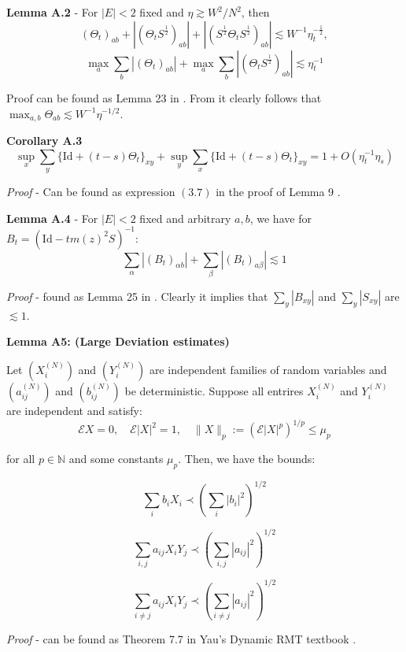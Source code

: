 \documentclass[11pt]{article}
\newenvironment{boxtheorem}[1]
  {\begin{mdframed}\noindent\textbf{#1}\itshape\space}
  {\end{mdframed}}
\newenvironment{boxt}[1]
  {\begin{mdframed}\noindent\textbf{#1}\normalfont\space}
  {\end{mdframed}}
\newcommand{\E}{\mathcal{E}}
\newcommand{\N}{\mathbb{N}}
\begin{document}
\begin{boxt}{Lemma A.2} \label{lemma-a2} -
 For $|E|<2$ fixed and $\eta\gtrsim W^2/N^2$, then $$(\Theta_t)_{ab} + |(\Theta_tS^{\frac{1}{2}})_{ab}| + |\left(S^{\frac{1}{2}}\Theta_t S^{\frac{1}{2}}\right)_{ab}|\lesssim W^{-1}\eta_t^{-\frac{1}{2}}, $$
 $$\max_a \sum_b |(\Theta_t)_{ab}|+\max_a \sum_b |(\Theta_tS^{\frac{1}{2}})_{ab}|\lesssim \eta_t^{-1}$$
\end{boxt}
Proof can be found as Lemma 23 in \cite{bandSDE}. From it clearly follows that $\max_{a,b}\Theta_{ab} \lesssim W^{-1}\eta^{-1/2}$. 

\begin{boxt}{Corollary A.3} \label{cor-a3} 
$$\sup_x \sum_y \{\text{Id}+(t-s)\Theta_t\}_{xy} + \sup_y \sum_x \{\text{Id} + (t-s)\Theta_t\}_{xy} = 1+O(\eta_t^{-1}\eta_s)$$
 \end{boxt}
 \textit{Proof} - Can be found as expression $(3.7)$ in the proof of Lemma 9 \cite{bandSDE}. 

\begin{boxt}{Lemma A.4} \label{lemma-a4} - For $|E|<2$ fixed and arbitrary $a, b$, we have for $B_t  =(\text{Id} - tm(z)^2S)^{-1}$: $$\sum_\alpha |(B_t)_{\alpha b}| + \sum_{\beta}|(B_t)_{a\beta}|\lesssim 1$$
 \end{boxt}
 \textit{Proof} - found as Lemma 25 in \cite{bandSDE}. Clearly it implies that $\sum_y |B_{xy}|$ and $\sum_y |S_{xy}|$ are $\lesssim 1$.  


 
  

\begin{boxtheorem}{Lemma A5: (Large Deviation estimates)}    \label{lemma-a5}

  

Let $\left(X_i^{(N)}\right)$ and $\left(Y_i^{(N)}\right)$ are independent families of random variables and $\left(a_{ij}^{(N)}\right)$ and $\left(b_{ij}^{(N)}\right)$ be deterministic. Suppose all entrires $X_{i}^{(N)}$ and $Y_{i}^{(N)}$ are independent and satisfy: $$\E X = 0, \quad \E |X|^2=1, \quad \|X\|_p:=(\E |X|^p)^{1/p}\leq \mu_p$$

for all $p\in \N$ and some constants $\mu_p$. Then, we have the bounds: 

\begin{equation*}\sum_i b_i X_i \prec \left(\sum_i |b_i|^2\right)^{1/2}\tag{1.1}\end{equation*}

\begin{equation*}\sum_{i, j} a_{ij}X_iY_j \prec \left(\sum_{i,j} |a_{ij}|^2\right)^{1/2}\tag{1.2}\end{equation*}

\begin{equation*}\sum_{i\neq j} a_{ij}X_iY_j \prec \left(\sum_{i\neq j} |a_{ij}|^2\right)^{1/2}\tag{1.3}\end{equation*}

\end{boxtheorem}
\textit{Proof} - can be found as Theorem 7.7 in Yau's Dynamic RMT textbook \cite{dynamic}. 
\end{document}
